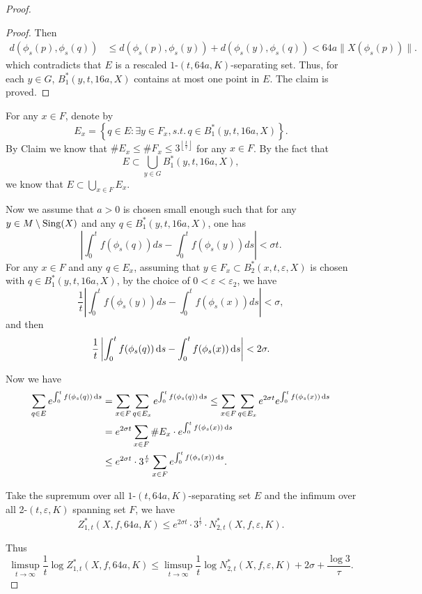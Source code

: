 \documentclass[10pt]{article}
\newtheorem*{Theorem A}{Theorem A}
\begin{document}
\begin{proof}
\begin{proof}
\noindent
Then
\[
\begin{aligned}
d(\phi_s(p), \phi_s(q)) &\leq d(\phi_s(p), \phi_s(y)) + d(\phi_s(y), \phi_s(q)) < 64a \| X(\phi_s(p)) \|.
\end{aligned}
\]
which contradicts that \(E\) is a rescaled \( 1\text{-}(t, 64a, K) \)-separating set. Thus, for each \( y \in G \), \( B_1^*(y, t, 16a, X) \) contains at most one point in \( E \).  The claim is proved.
\end{proof}

For any $x\in F$, denote by
$$E_x=\left\{q\in E :  \exists y\in F_x, s.t. \, q\in B_1^*(y, t, 16a, X)\right\}.$$
By Claim we know that $\#E_x\leq \#F_x \leq 3^{\left\lfloor \frac{t}{\tau} \right\rfloor}$ for any $x\in F$. By the fact that
$$E\subset \bigcup_{y\in G}B_1^*(y, t, 16a, X),$$
we know that $E\subset\bigcup\limits_{x\in F}E_x$.

Now we assume that  \(a>0\) is chosen small enough such that for any $y\in M\setminus {\rm Sing}(X)$ and any \( q \in B_1^*(y, t, 16a, X) \), one has
\[
\left| \int_0^t f(\phi_s(q)) ds - \int_0^t f(\phi_s(y)) ds \right| < \sigma t.
\]
For any $x\in F$ and any $q\in E_x$, assuming that $y\in F_x\subset B_2^*(x, t, \varepsilon, X)$ is chosen with $q\in B_1^*(y, t, 16a, X)$, by the choice of $0<\varepsilon<\varepsilon_2$, we have
\[
\frac{1}{t} \left| \int_0^t f(\phi_s(y)) ds - \int_0^t f(\phi_s(x)) ds \right| < \sigma,
\]
and then \[ \frac{1}{t}\left| \int_0^t f(\phi_s(q)) \, {\rm d}s - \int_0^t f(\phi_s(x)) \, {\rm d}s \right| < 2\sigma. \]

Now we have
\[
\begin{aligned}
\sum_{q \in E} e^{\int_0^t f(\phi_s (q)) \, {\rm d}s}  &= \sum_{x \in F} \sum_{q \in E_x} e^{\int_0^t f(\phi_s (q)) \, {\rm d}s}
\leq \sum_{x \in F} \sum_{q \in E_x} e^{2\sigma t} e^{\int_0^t f(\phi_s (x)) \, {\rm d}s}
\\&= e^{2\sigma t} \sum_{x \in F} \#E_x \cdot e^{\int_0^t f(\phi_s (x)) \, {\rm d}s }
\\ &\leq e^{2\sigma t} \cdot 3^{\frac{t}{\tau}} \sum_{x \in F} e^{\int_0^t f(\phi_s (x)) \, {\rm d}s}.
\end{aligned}
\]

\noindent
Take the supremum over all \( 1\text{-}(t, 64a, K) \)-separating set \(E\) and the infimum over all 2-$(t, \varepsilon, K)$ spanning set $F$, we have
\[
Z_{1,t}^*(X, f, 64a, K) \leq e^{2\sigma t} \cdot 3^{\frac{t}{\tau}} \cdot N_{2,t}^*(X, f, \varepsilon, K).
\]

\noindent
Thus
\[
\limsup_{t \to \infty} \frac{1}{t} \log Z_{1,t}^*(X, f, 64a, K) \leq \limsup_{t \to \infty} \frac{1}{t} \log N_{2,t}^*(X, f, \varepsilon, K) + 2\sigma + \frac{\log 3}{\tau}.
\]


\end{proof}
\end{document}
